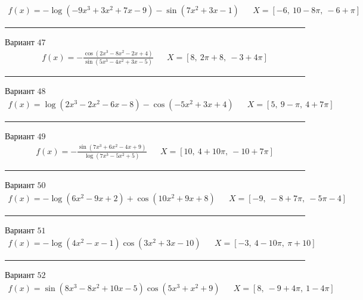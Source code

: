 \documentclass[11pt]{report}
\begin{document}
\begin{align*}
    f(x) = - \log{\left(- 9 x^{3} + 3 x^{2} + 7 x - 9 \right)} - \sin{\left(7 x^{2} + 3 x - 1 \right)} && X = \left[ -6, \  10 - 8 \pi, \  -6 + \pi\right]
\end{align*}
\begin{center}
    \noindent\rule{8cm}{0.4pt}
\end{center}
Вариант \(47\)
\begin{align*}
    f(x) = - \frac{\cos{\left(2 x^{3} - 8 x^{2} - 2 x + 4 \right)}}{\sin{\left(5 x^{3} - 4 x^{2} + 3 x - 5 \right)}} && X = \left[ 8, \  2 \pi + 8, \  -3 + 4 \pi\right]
\end{align*}
\begin{center}
    \noindent\rule{8cm}{0.4pt}
\end{center}
Вариант \(48\)
\begin{align*}
    f(x) = \log{\left(2 x^{3} - 2 x^{2} - 6 x - 8 \right)} - \cos{\left(- 5 x^{2} + 3 x + 4 \right)} && X = \left[ 5, \  9 - \pi, \  4 + 7 \pi\right]
\end{align*}
\begin{center}
    \noindent\rule{8cm}{0.4pt}
\end{center}
Вариант \(49\)
\begin{align*}
    f(x) = - \frac{\sin{\left(7 x^{3} + 6 x^{2} - 4 x + 9 \right)}}{\log{\left(7 x^{3} - 5 x^{2} + 5 \right)}} && X = \left[ 10, \  4 + 10 \pi, \  -10 + 7 \pi\right]
\end{align*}
\begin{center}
    \noindent\rule{8cm}{0.4pt}
\end{center}
Вариант \(50\)
\begin{align*}
    f(x) = - \log{\left(6 x^{2} - 9 x + 2 \right)} + \cos{\left(10 x^{2} + 9 x + 8 \right)} && X = \left[ -9, \  -8 + 7 \pi, \  - 5 \pi - 4\right]
\end{align*}
\begin{center}
    \noindent\rule{8cm}{0.4pt}
\end{center}
Вариант \(51\)
\begin{align*}
    f(x) = - \log{\left(4 x^{2} - x - 1 \right)} \cos{\left(3 x^{2} + 3 x - 10 \right)} && X = \left[ -3, \  4 - 10 \pi, \  \pi + 10\right]
\end{align*}
\begin{center}
    \noindent\rule{8cm}{0.4pt}
\end{center}
Вариант \(52\)
\begin{align*}
    f(x) = \sin{\left(8 x^{3} - 8 x^{2} + 10 x - 5 \right)} \cos{\left(5 x^{3} + x^{2} + 9 \right)} && X = \left[ 8, \  -9 + 4 \pi, \  1 - 4 \pi\right]
\end{align*}
\end{document}
